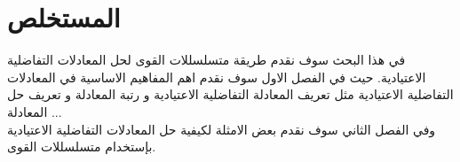 \chapter*{المستخلص}

في هذا البحث سوف نقدم طريقة متسلسللات القوى لحل المعادلات التفاضلية الاعتيادية. حيث في الفصل الاول سوف نقدم اهم المفاهيم الاساسية في المعادلات التفاضلية الاعتيادية مثل تعريف المعادلة التفاضلية الاعتيادية و رتبة المعادلة و تعريف حل المعادلة ... \\
\noindent
وفي الفصل الثاني سوف نقدم بعض الامثلة لكيفية حل المعادلات التفاضلية الاعتيادية بإستخدام متسلسللات القوى.